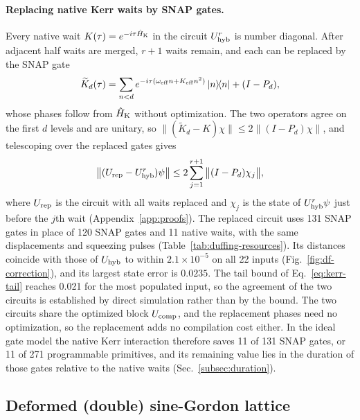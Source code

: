 \documentclass[pra,twocolumn,superscriptaddress,nofootinbib,floatfix]{revtex4-2}
\theoremstyle{remark}
\begin{document}
\paragraph{Replacing native Kerr waits by SNAP gates.}
Every native wait \(K(\tau)=e^{-i\tau\hat H_{\rm K}}\) in the circuit \(U_{\rm hyb}^r\) is number diagonal. After adjacent half waits are merged, \(r+1\) waits remain, and each can be replaced by the SNAP gate
\begin{align}
\widetilde K_d(\tau)=\sum_{n<d}e^{-i\tau(\omega_{\rm eff}n+K_{\rm eff}n^2)}\ketbra{n}{n}+(I-P_d),
\label{eq:kerr-snap}
\end{align}
whose phases follow from \(\hat H_{\rm K}\) without optimization. The two operators agree on the first \(d\) levels and are unitary, so \(\|(\widetilde K_d-K)\chi\|\le2\|(I-P_d)\chi\|\), and telescoping over the replaced gates gives
\begin{align}
\big\|(U_{\rm rep}-U_{\rm hyb}^r)\psi\big\|\le2\sum_{j=1}^{r+1}\big\|(I-P_d)\chi_j\big\| ,
\label{eq:kerr-tail}
\end{align}
where \(U_{\rm rep}\) is the circuit with all waits replaced and \(\chi_j\) is the state of \(U_{\rm hyb}^r\psi\) just before the \(j\)th wait (Appendix~\ref{app:proofs}). The replaced circuit uses 131 SNAP gates in place of 120 SNAP gates and 11 native waits, with the same displacements and squeezing pulses (Table~\ref{tab:duffing-resources}). Its distances coincide with those of \(U_{\rm hyb}\) to within \(2.1\times10^{-5}\) on all 22 inputs (Fig.~\ref{fig:df-correction}), and its largest state error is \(0.0235\). The tail bound of Eq.~\eqref{eq:kerr-tail} reaches 0.021 for the most populated input, so the agreement of the two circuits is established by direct simulation rather than by the bound. The two circuits share the optimized block \(U_{\rm comp}\), and the replacement phases need no optimization, so the replacement adds no compilation cost either. In the ideal gate model the native Kerr interaction therefore saves 11 of 131 SNAP gates, or 11 of 271 programmable primitives, and its remaining value lies in the duration of those gates relative to the native waits (Sec.~\ref{subsec:duration}).


\subsection{Deformed (double) sine-Gordon lattice}
\label{sec:dsg}
\end{document}

